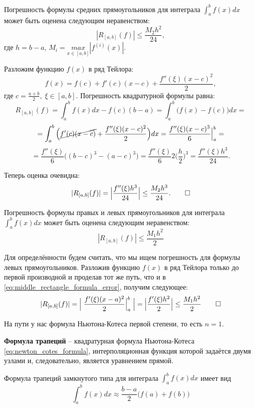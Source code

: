 \documentclass[../main.tex]{subfile}
\begin{document}
\begin{theorem}
\label{eq:middle_rectangle_formula_error}
	Погрешность формулы средних прямоугольников для интеграла $\int_a^b
	f(x)dx$ может быть оценена следующим неравенством:
	\[\boxed{|R_{[a,b]}(f)|\le\frac{M_2h^2}{24}},\]
	где $h=b-a$, $M_i=\underset{x\in[a,b]}{max}|f^{(i)}(x)|.$
\end{theorem}

\beginproof

	Разложим функцию $f(x)$ в ряд Тейлора:
	\[f(x)=f(c)+f'(c)(x-c)+\frac{f''(\xi)(x-c)^2}{2},\]
	где $c=\frac{a+b}{2},\;\xi\in[a,b].$ Погрешность квадратурной формулы
	равна:
	\[R_{[a,b]}(f)=\int_a^b f(x)dx - f(c)(b-a)=\int_a^b\big(f(x) - f(c)\big)
	dx=\]
	\[=\int_a^b \Big(\cancel{f'(c)(x-c)}+\frac{f''(\xi)(x-c)^2}{2}\Big)dx=
	\frac{f''(\xi)(x-c)^3}{6}\Big|_a^b=\]
	\[=\frac{f''(\xi)}{6}\Big((b-c)^3-(a-c)^3\Big)=\frac{f''(\xi)}{6}2\Big(
	\frac{h}{2}\Big)^3=\frac{f''(\xi)h^3}{24}.\]

	Теперь оценка очевидна:
	\[|R_{[a,b]}(f)|=\Big|\frac{f''(\xi)h^3}{24}\Big|\le\frac{M_2h^3}{24}.
	\qed\]

\begin{theorem}
	Погрешность формулы правых и левых прямоугольников для интеграла
	$\int_a^b f(x)dx$ может быть оценена следующим неравенством:
	\[\boxed{|R_{[a,b]}(f)|\le\frac{M_1h^2}{2}}\]
\end{theorem}

\beginproof

	Для определённости будем считать, что мы ищем погрешность для формулы
	левых прямоугольников. Разложив функцию $f(x)$ в ряд Тейлора только до
	первой производной и проделав тот же путь, что и в
	\eqref{eq:middle_rectangle_formula_error}, получим следующее:
	\[|R_{[a,b]}(f)|=\Big|\;\frac{f'(\xi)(x-a)^2}{2}\Big|_a^b\;\Big|=
	\Big|\frac{f'(\xi)h^2}{2}\Big|\le\frac{M_1h^2}{2}\qed\]

На пути у нас формула Ньютона-Котеса первой степени, то есть $n=1$.

\begin{define}
	\textbf{Формула трапеций} -- квадратурная формула Ньютона-Котеса
	\eqref{eq:newton_cotes_formula}, интерполяционная функция которой
	задаётся двумя узлами и, следовательно, является уравнением прямой.
\end{define}

\begin{theorem}
	Формула трапеций замкнутого типа для интеграла $\int_a^b f(x)dx$ имеет
	вид
	\[\boxed{\int_a^b f(x)dx\approx\frac{b-a}{2}\big(f(a)+f(b)\big)}\]
\end{theorem}
\newpage
\end{document}
